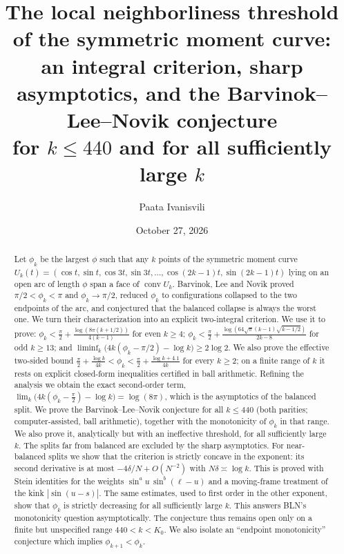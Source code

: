 \documentclass[11pt]{amsart}
\title[Neighborliness threshold of the symmetric moment curve]{The local neighborliness threshold of the symmetric moment curve:\\
an integral criterion, sharp asymptotics, and the Barvinok--Lee--Novik conjecture\\ for $k\le440$ and for all sufficiently large $k$}
\author{Paata Ivanisvili}
\date{October 27, 2026}
\theoremstyle{definition}
\begin{document}
\begin{abstract}
Let $\phi_k$ be the largest $\phi$ such that any $k$ points of the symmetric moment curve
$U_k(t)=(\cos t,\sin t,\cos3t,\sin3t,\dots,\cos(2k-1)t,\sin(2k-1)t)$ lying on an open arc of length $\phi$ span a face of
$\operatorname{conv}U_k$. Barvinok, Lee and Novik proved $\pi/2<\phi_k<\pi$ and $\phi_k\to\pi/2$, reduced $\phi_k$ to configurations
collapsed to the two endpoints of the arc, and conjectured that the balanced collapse is always the worst one.
We turn their characterization into an explicit two-integral criterion. We use it to prove:
$\phi_k<\frac\pi2+\frac{\log(8\pi(k+1/2))}{4(k-1)}$ for even $k\ge4$;
$\phi_k<\frac\pi2+\frac{\log(64\sqrt\pi(k-1)\sqrt{k-1/2})}{2k-8}$ for odd $k\ge13$;
and $\liminf_k\big(4k(\phi_k-\pi/2)-\log k\big)\ge2\log2$. We also prove the effective two-sided bound
$\frac\pi2+\frac{\log k}{4k}<\phi_k<\frac\pi2+\frac{\log k+4.1}{4k}$ for every $k\ge2$; on a finite range of $k$ it rests on explicit closed-form
inequalities certified in ball arithmetic. Refining the analysis we obtain the exact second-order term,
$\lim_k\big(4k(\phi_k-\frac\pi2)-\log k\big)=\log(8\pi)$, which is the asymptotics of the balanced split. We prove the
Barvinok--Lee--Novik conjecture for all $k\le440$ (both parities; computer-assisted, ball arithmetic), together with the monotonicity of
$\phi_k$ in that range. We also prove it, analytically but with an ineffective threshold, for all sufficiently large $k$. The splits far from
balanced are excluded by the sharp asymptotics. For near-balanced splits we show that the criterion is strictly concave in the exponent: its second
derivative is at most $-4\delta/N+O(N^{-2})$ with $N\delta\asymp\log k$. This is proved with Stein identities for the weights
$\sin^au\,\sin^b(\ell-u)$ and a moving-frame treatment of the kink $|\sin(u-s)|$. The same estimates, used to first order in the other exponent, show that $\phi_k$ is strictly decreasing for all
sufficiently large $k$. This answers BLN's monotonicity question asymptotically. The conjecture thus remains open only on a finite but
unspecified range $440<k<K_0$. We also isolate an ``endpoint monotonicity'' conjecture which implies $\phi_{k+1}<\phi_k$.
\end{abstract}
\makeatletter
\let\aidisc@setabstracta\@setabstracta
\def\@setabstracta{\par\vskip 10pt{\centering\small\itshape
This proof was generated on October 27, 2026, by Grok Bot using Cursor’s agents, guided by several prompts from Paata Ivanisvili
\par}\aidisc@setabstracta}
\makeatother
\maketitle
\end{document}
